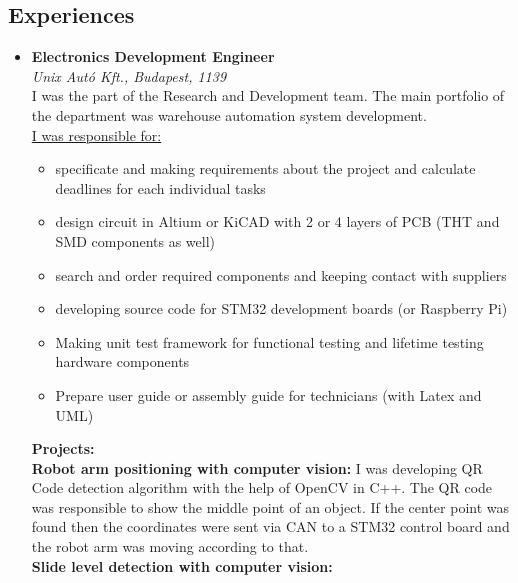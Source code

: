 \documentclass[11pt,oneslide,a4paper,titlepage]{article}
\begin{document}
\begin{tcolorbox}
\begin{minipage}[t]{11cm}
\begin{tcolorbox}[grow to right by=0.75cm,colframe=white,colback=white]
			\section*{Experiences}
			\begin{itemize}
				\item{
					\textbf{Electronics Development Engineer} \\	
					\emph{Unix Autó Kft., Budapest, 1139} \\
					\newline I was the part of the Research and Development team. The main portfolio of the department was warehouse automation system development. \\
					\newline \underline{I was responsible for:}
					\begin{itemize}
						\item{specificate and making requirements about the project and calculate deadlines for each individual tasks}
						\item{design circuit in Altium or KiCAD with 2 or 4 layers of PCB (THT and SMD components as well)}
						\item{search and order required components and keeping contact with suppliers}
						\item{developing source code for STM32 development boards (or Raspberry Pi)}
						\item{Making unit test framework for functional testing and lifetime testing hardware components}
						\item{Prepare user guide or assembly guide for technicians (with Latex and UML)}
					\end{itemize}
					
					\textbf{Projects:} \\
				    \newline \textbf{Robot arm positioning with computer vision:} I was developing QR Code detection algorithm with the help of OpenCV in C++. The QR code was responsible to show the middle point of an object. If the center point was found then the coordinates were sent via CAN to a STM32 control board and the robot arm was moving according to that. \\
				    \newline \textbf{Slide level detection with computer vision:}
				}
			\end{itemize}				
			
		\end{tcolorbox}
	\end{minipage}
\end{tcolorbox}
\end{document}
